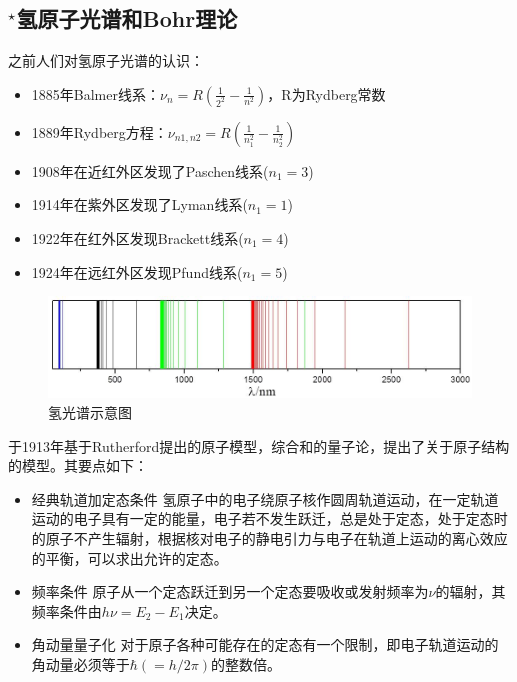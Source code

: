 \subsection{$^\star$氢原子光谱和Bohr理论}
\bohr 之前人们对氢原子光谱的认识：
\begin{itemize}
\item 1885年Balmer线系：$\nu_n=R(\frac{1}{2^2}-\frac{1}{n^2})$，R为Rydberg常数
\item 1889年Rydberg方程：$\nu_{n1,n2}=R(\frac{1}{n_1^2}-\frac{1}{n_2^2})$
\item 1908年在近红外区发现了Paschen线系($n_1=3$)
\item 1914年在紫外区发现了Lyman线系($n_1=1$)
\item 1922年在红外区发现Brackett线系($n_1=4$)
\item 1924年在远红外区发现Pfund线系($n_1=5$)
\end{itemize}

\begin{figure}[!ht]
\centering
\includegraphics[width=\textwidth]{pic/H_spectroscopy.jpg}
\caption{氢光谱示意图}
\end{figure}

\begin{statT}[Bohr理论要点]
\bohr 于1913年基于Rutherford提出的原子模型，综合\planck 和\einstein 的量子论，提出了关于原子结构的模型。其要点如下：
\begin{itemize}
\item 经典轨道加定态条件
\small{氢原子中的电子绕原子核作圆周轨道运动，在一定轨道运动的电子具有一定的能量，电子若不发生跃迁，总是处于定态，处于定态时的原子不产生辐射，根据核对电子的静电引力与电子在轨道上运动的离心效应的平衡，可以求出允许的定态。}

\item 频率条件
\small{原子从一个定态跃迁到另一个定态要吸收或发射频率为$\nu$的辐射，其频率条件由$ h\nu = E_2 - E_1 $决定。}

\item 角动量量子化
\small{对于原子各种可能存在的定态有一个限制，即电子轨道运动的角动量必须等于$\hbar(=h/2\pi)$的整数倍。}
\end{itemize}
\end{statT}

